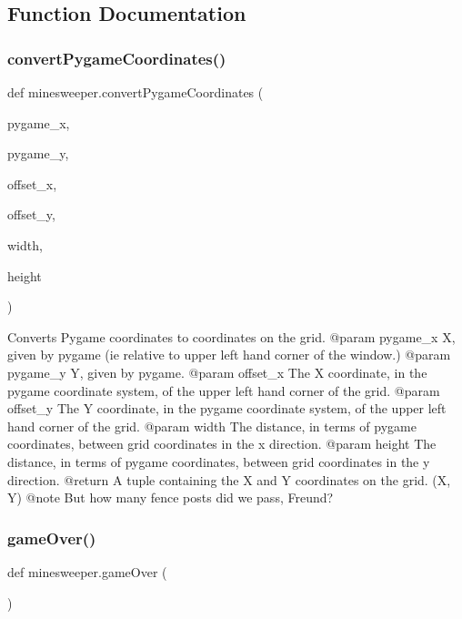 \subsection{Function Documentation}
\mbox{\label{namespaceminesweeper_a73d5ef833018e322089c59ae52ef8aa1}} 
\subsubsection{\texorpdfstring{convertPygameCoordinates()}{convertPygameCoordinates()}}
{\footnotesize\ttfamily def minesweeper.\+convert\+Pygame\+Coordinates (\begin{DoxyParamCaption}\item[{}]{pygame\+\_\+x,  }\item[{}]{pygame\+\_\+y,  }\item[{}]{offset\+\_\+x,  }\item[{}]{offset\+\_\+y,  }\item[{}]{width,  }\item[{}]{height }\end{DoxyParamCaption})}

\begin{DoxyVerb}Converts Pygame coordinates to coordinates on the grid.
@param pygame_x X, given by pygame (ie relative to upper left hand corner of the window.)
@param pygame_y Y, given by pygame.
@param offset_x The X coordinate, in the pygame coordinate system, of the upper left hand corner of the grid.
@param offset_y The Y coordinate, in the pygame coordinate system, of the upper left hand corner of the grid.
@param width The distance, in terms of pygame coordinates, between grid coordinates in the x direction.
@param height The distance, in terms of pygame coordinates, between grid coordinates in the y direction.
@return A tuple containing the X and Y coordinates on the grid. (X, Y)
@note But how many fence posts did we pass, Freund?
\end{DoxyVerb}
 \mbox{\label{namespaceminesweeper_a6e2c2ee2c912ecebb7e255ba9d424bd9}} 
\subsubsection{\texorpdfstring{gameOver()}{gameOver()}}
{\footnotesize\ttfamily def minesweeper.\+game\+Over (\begin{DoxyParamCaption}{ }\end{DoxyParamCaption})}

